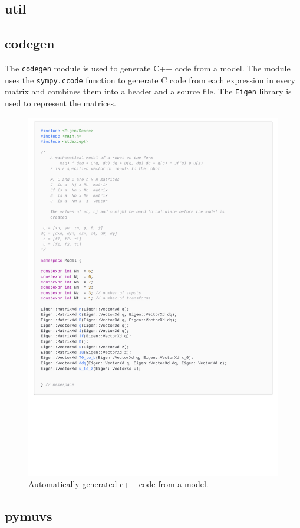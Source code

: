 \subsection{util}


\subsection{codegen}
The \texttt{codegen} module is used to generate C++ code from a model. The module
uses the \texttt{sympy.ccode} function to generate C code from
each expression in every matrix and combines them into a header and a source
file. The \texttt{Eigen} library \cite{eigen3} is used to represent the matrices.

\begin{figure}[h]
    \centering
    \includegraphics[page=1,width=\linewidth,trim=0 9cm 0 0]{assets/codegen.pdf}
    \caption{Automatically generated c++ code from a model.}
    \label{fig:codegen}
\end{figure}

\subsection{pymuvs}
